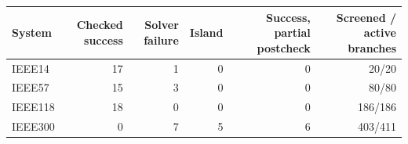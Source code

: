 \documentclass[10pt]{article}
\makeatletter
\newenvironment{exporttable}{\par\noindent\begin{minipage}{\linewidth}\def\@captype{table}}{\end{minipage}\par}
\makeatother
\begin{document}
\clearpage
\setcounter{table}{8}
\begin{exporttable}
\centering\small
\caption{Separate PGLib electrical checks, retaining all 18 cases per system. Screened branches pass a conservative postcheck filter; the last column does not count all ratings provided by the source.}
\label{tab:physical_scope}
\begin{tabular}{lrrrrr}
\toprule
System & Checked success & Solver failure & Island & Success, partial postcheck & Screened / active branches\\
\midrule
IEEE14 & 17 & 1 & 0 & 0 & 20/20\\
IEEE57 & 15 & 3 & 0 & 0 & 80/80\\
IEEE118 & 18 & 0 & 0 & 0 & 186/186\\
IEEE300 & 0 & 7 & 5 & 6 & 403/411\\
\bottomrule
\end{tabular}
\end{exporttable}
\clearpage
\end{document}

